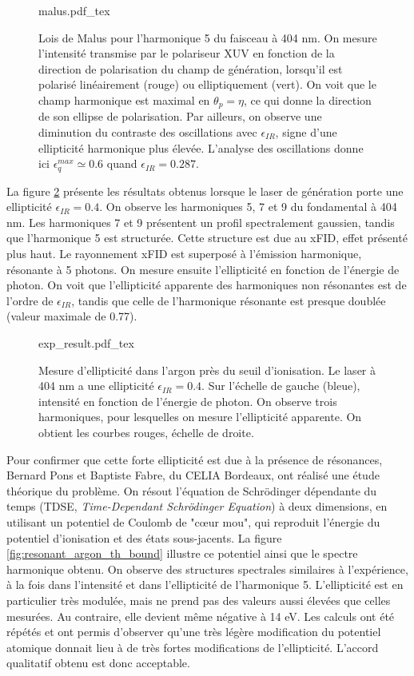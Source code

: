 \begin{figure}[!ht]
\centering
\def\svgwidth{0.7\columnwidth}
{malus.pdf_tex}
\caption{Lois de Malus pour l'harmonique 5 du faisceau à 404 nm. On mesure l'intensité transmise par le polariseur XUV en fonction de la direction de polarisation du champ de génération, lorsqu'il est polarisé linéairement (rouge) ou elliptiquement (vert). On voit que le champ harmonique est maximal en $\theta_p = \eta$, ce qui donne la direction de son ellipse de polarisation. Par ailleurs, on observe une diminution du contraste des oscillations avec $\epsilon_{IR}$, signe d'une ellipticité harmonique plus élevée. L'analyse des oscillations donne ici $\epsilon_q^{max} \simeq 0.6$ quand $\epsilon_{IR}=0.287$.}
\label{fig:malus}
\end{figure}

La figure \ref{fig:resonant_argon_exp} présente les résultats obtenus lorsque le laser de génération porte une ellipticité $\epsilon_{IR} = 0.4$. On observe les harmoniques 5, 7 et 9 du fondamental à 404 nm. Les harmoniques 7 et 9 présentent un profil spectralement gaussien, tandis que l'harmonique 5 est structurée. Cette structure est due au xFID, effet présenté plus haut. Le rayonnement xFID est superposé à l'émission harmonique, résonante à 5 photons.  On mesure ensuite l'ellipticité en fonction de l'énergie de photon. On voit que l'ellipticité apparente des harmoniques non résonantes est de l'ordre de $\epsilon_{IR}$, tandis que celle de l'harmonique résonante est presque doublée (valeur maximale de 0.77).  

\begin{figure}[!ht]
\centering
\def\svgwidth{1\columnwidth}
{exp_result.pdf_tex}
\caption{Mesure d'ellipticité dans l'argon près du seuil d'ionisation. Le laser à 404 nm a une ellipticité $\epsilon_{IR}=0.4$. Sur l'échelle de gauche (bleue), intensité en fonction de l'énergie de photon. On observe trois harmoniques, pour lesquelles on mesure l'ellipticité apparente. On obtient les courbes rouges, échelle de droite.}
\label{fig:resonant_argon_exp}
\end{figure}

Pour confirmer que cette forte ellipticité est due à la présence de résonances, Bernard Pons et Baptiste Fabre, du CELIA Bordeaux, ont réalisé une étude théorique du problème. On résout l'équation de Schrödinger dépendante du temps (TDSE, \textit{Time-Dependant Schrödinger Equation}) à deux dimensions, en utilisant un potentiel de Coulomb de "cœur mou", qui reproduit l'énergie du potentiel d'ionisation et des états sous-jacents. La figure \ref{fig:resonant_argon_th_bound} illustre ce potentiel ainsi que le spectre harmonique obtenu. On observe des structures spectrales similaires à l'expérience, à la fois dans l'intensité et dans l'ellipticité de l'harmonique 5. L'ellipticité est en particulier très modulée, mais ne prend pas des valeurs aussi élevées que celles mesurées. Au contraire, elle devient même négative à 14 eV. Les calculs ont été répétés et ont permis d'observer qu'une très légère modification du potentiel atomique donnait lieu à de très fortes modifications de l'ellipticité. L'accord qualitatif obtenu est donc acceptable.

